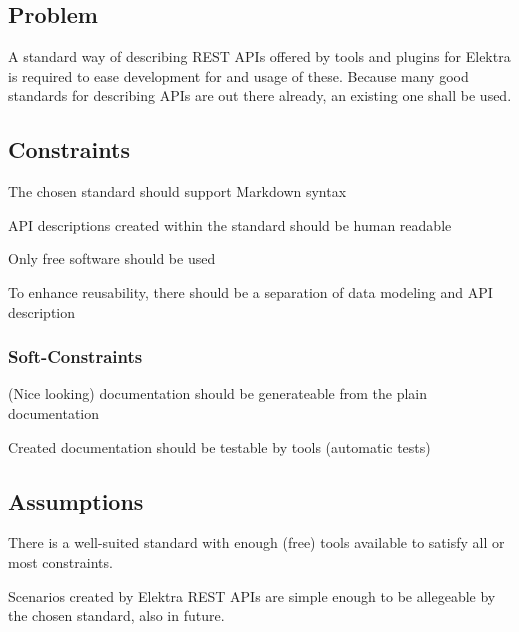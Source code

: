 \subsection*{Problem}

A standard way of describing R\+E\+ST A\+P\+Is offered by tools and plugins for Elektra is required to ease development for and usage of these. Because many good standards for describing A\+P\+Is are out there already, an existing one shall be used.

\subsection*{Constraints}


\begin{DoxyItemize}
\item The chosen standard should support Markdown syntax
\item A\+PI descriptions created within the standard should be human readable
\item Only free software should be used
\item To enhance reusability, there should be a separation of data modeling and A\+PI description
\end{DoxyItemize}

\subsubsection*{Soft-\/\+Constraints}


\begin{DoxyItemize}
\item (Nice looking) documentation should be generateable from the plain documentation
\item Created documentation should be testable by tools (automatic tests)
\end{DoxyItemize}

\subsection*{Assumptions}


\begin{DoxyItemize}
\item There is a well-\/suited standard with enough (free) tools available to satisfy all or most constraints.
\item Scenarios created by Elektra R\+E\+ST A\+P\+Is are simple enough to be allegeable by the chosen standard, also in future.
\end{DoxyItemize}

